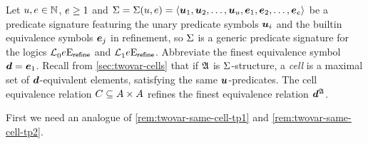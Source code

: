 
Let $u, e \in \mathbb{N}$, $e \geq 1$ and $\mathrm{\Sigma} = \mathrm{\Sigma}(u,e) =
\left\langle \bm{u}_{1},\bm{u}_{2},\dots,\bm{u}_{u},\bm{e}_{1},\bm{e}_{2},\dots,\bm{e}_{e} \right\rangle$ be a predicate
signature featuring the unary predicate symbols $\bm{u}_{i}$ and the builtin
equivalence symbols $\bm{e}_{j}$ in refinement, so $\mathrm{\Sigma}$ is a generic predicate
signature for the logics $\mathcal{L}^{{}}_{0}{e}\mathrm{E}_{\mathsf{refine}}$ and
$\mathcal{L}^{{}}_{1}{e}\mathrm{E}_{\mathsf{refine}}$. Abbreviate the finest equivalence symbol $\bm{d}
= \bm{e}_{1}$.
Recall from \cref{sec:twovar-cells} that if $\mathfrak{A}$ is $\mathrm{\Sigma}$-structure, a
\emph{cell} is a maximal set of $\bm{d}$-equivalent elements, satisfying the same
$\bm{u}$-predicates. The cell equivalence relation $C \subseteq {A\times A}$ refines
the finest equivalence relation $\bm{d}^{\mathfrak{A}}$.

First we need an analogue of \cref{rem:twovar-same-cell-tp1} and
\cref{rem:twovar-same-cell-tp2}.

